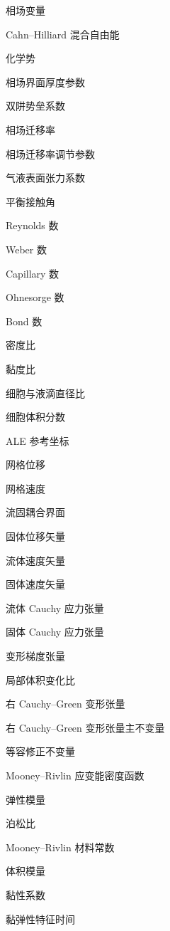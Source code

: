 \begin{denotation}[3.0cm]

\item[$\varphi$] 相场变量
\item[$F_{\mathrm{CH}}$] Cahn--Hilliard 混合自由能
\item[$G$] 化学势
\item[$\varepsilon_{\mathrm{int}}$] 相场界面厚度参数
\item[$W_{\mathrm{dw}}$] 双阱势垒系数
\item[$M$] 相场迁移率
\item[$\chi$] 相场迁移率调节参数
\item[$\gamma_{\mathrm{lg}}$] 气液表面张力系数
\item[$\theta_{\mathrm e}$] 平衡接触角

\item[$\mathrm{Re}$] Reynolds 数
\item[$\mathrm{We}$] Weber 数
\item[$\mathrm{Ca}$] Capillary 数
\item[$\mathrm{Oh}$] Ohnesorge 数
\item[$\mathrm{Bo}$] Bond 数
\item[$\rho_r$] 密度比
\item[$\mu_r$] 黏度比
\item[$\Lambda$] 细胞与液滴直径比
\item[$\alpha_{\mathrm s}$] 细胞体积分数

\item[$\boldsymbol{\chi}$] ALE 参考坐标
\item[$\boldsymbol{u}_{\mathrm g}$] 网格位移
\item[$\boldsymbol{v}_{\mathrm g}$] 网格速度
\item[$\Gamma_{\mathrm{fs}}$] 流固耦合界面
\item[$\boldsymbol{u}_{\mathrm s}$] 固体位移矢量
\item[$\boldsymbol{v}_{\mathrm f}$] 流体速度矢量
\item[$\boldsymbol{v}_{\mathrm s}$] 固体速度矢量
\item[$\boldsymbol{\sigma}_{\mathrm f}$] 流体 Cauchy 应力张量
\item[$\boldsymbol{\sigma}_{\mathrm s}$] 固体 Cauchy 应力张量
\item[$\boldsymbol{F}$] 变形梯度张量
\item[$J$] 局部体积变化比
\item[$\boldsymbol{C}$] 右 Cauchy--Green 变形张量
\item[$I_1,I_2,I_3$] 右 Cauchy--Green 变形张量主不变量
\item[$\bar I_1,\bar I_2$] 等容修正不变量
\item[$W_{\mathrm{MR}}$] Mooney--Rivlin 应变能密度函数
\item[$E$] 弹性模量
\item[$\nu$] 泊松比
\item[$C_{10},C_{01}$] Mooney--Rivlin 材料常数
\item[$\kappa$] 体积模量
\item[$\eta_{\mathrm s}$] 黏性系数
\item[$\tau_{\mathrm v}$] 黏弹性特征时间


\end{denotation}
